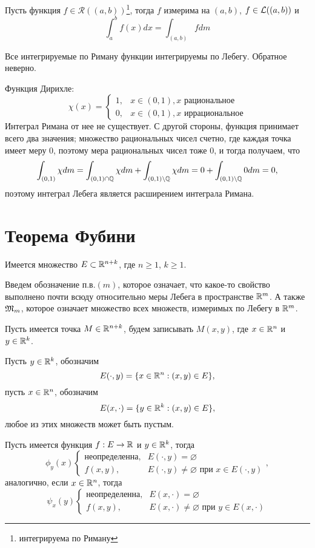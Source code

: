 \documentclass[main]{subfiles}
\begin{document}
\begin{theorem}
    Пусть функция $f \in \mathcal{R}((a,b))$\footnote{интегрируема по Риману}, тогда $f$ измерима на $(a, b)$, $f \in \mathcal{L}((a,b))$ и
    \[\int_{a}^{b} f(x) dx = \int_{(a, b)} f dm\]
\end{theorem}
Все интегрируемые по Риману функции интегрируемы по Лебегу.
Обратное неверно.
\begin{example}
    Функция Дирихле:
    \[\chi(x) = \begin{cases}
            1, & x \in (0, 1), x \text{ рациональное}   \\
            0, & x \in (0, 1), x \text{ иррациональное}
        \end{cases}\]
    Интеграл Римана от нее не существует.
    С другой стороны, функция принимает всего два значения; множество рациональных чисел счетно, где каждая точка имеет меру 0, поэтому мера рациональных чисел тоже 0, и тогда получаем, что
    \[\int_{(0, 1)} \chi dm = \int_{(0, 1) \cap \mathbb{Q}} \chi dm + \int_{(0, 1) \setminus \mathbb{Q}} \chi dm = 0 + \int_{(0, 1) \setminus \mathbb{Q}} 0 dm = 0,\]
    поэтому интеграл Лебега является расширением интеграла Римана.
\end{example}

\section{Теорема Фубини}

Имеется множество $E \subset \mathbb{R}^{n+k}$, где $n \ge 1$, $k \ge 1$.

Введем обозначение п.в.$(m)$, которое означает, что какое-то свойство выполнено почти всюду относительно меры Лебега в пространстве $\mathbb{R}^m$.
А также $\mathfrak{M}_m$, которое означает множество всех множеств, измеримых по Лебегу в $\mathbb{R}^m$.

Пусть имеется точка $M \in \mathbb{R}^{n+k}$, будем записывать $M(x, y)$, где $x \in \mathbb{R}^n$ и $y \in \mathbb{R}^k$.

Пусть $y \in \mathbb{R}^k$, обозначим
\[E(\cdot, y) = \{x \in \mathbb{R}^n: (x, y) \in E\},\]
пусть $x \in \mathbb{R}^n$, обозначим
\[E(x, \cdot) = \{y \in \mathbb{R}^k: (x, y) \in E\},\]
любое из этих множеств может быть пустым.

Пусть имеется функция $f: E \to \mathbb{R}$ и $y \in \mathbb{R}^k$, тогда
\[\phi_y(x) \begin{cases}
        \text{неопределенна}, & E(\cdot, y) = \varnothing                                   \\
        f(x, y),              & E(\cdot, y) \neq \varnothing \text{ при } x \in E(\cdot, y)
    \end{cases},\]
аналогично, если $x \in \mathbb{R}^n$, тогда
\[\psi_x(y) \begin{cases}
        \text{неопределенна}, & E(x, \cdot) = \varnothing                                   \\
        f(x, y),              & E(x, \cdot) \neq \varnothing \text{ при } y \in E(x, \cdot)
    \end{cases}\]
\end{document}

